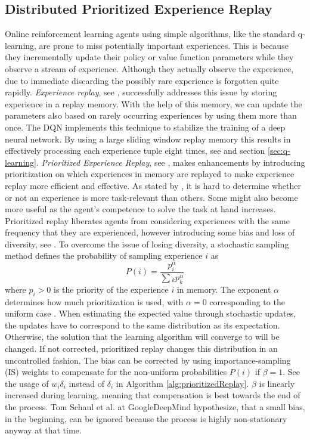\documentclass[12pt,a4paper]{article}
\begin{document}
\subsection{Distributed Prioritized Experience Replay}
Online reinforcement learning agents using simple algorithms, like the standard q-learning, are prone to miss potentially important experiences. This is because they incrementally update their policy or value function parameters while they observe a stream of experience. Although they actually observe the experience, due to immediate discarding the possibly rare experience is forgotten quite rapidly.
{\it Experience replay}, see \cite{Lin2014}, successfully addresses this issue by storing experience in a replay memory. With the help of this memory, we can update the parameters also based on rarely occurring experiences by using them more than once. The DQN implements this technique to stabilize the training of a deep neural network. By using a large sliding window replay memory this results in effectively processing each experience tuple eight times, see \cite{Schaul2016} and section \ref{sec:q-learning}.
{\it Prioritized Experience Replay}, see \cite{Schaul2016}, makes enhancements by introducing prioritization on which experiences in memory are replayed to make experience replay more efficient and effective. As stated by \cite{Schmidhuber1991CuriousMC}, it is hard to determine whether or not an experience is more task-relevant than others. Some might also become more useful as the agent's competence to solve the task at hand increases. Prioritized replay liberates agents from considering experiences with the same frequency that they are experienced, however introducing some bias and loss of diversity, see \cite{Schaul2016}.
To overcome the issue of losing diversity, a stochastic sampling method defines the probability of sampling experience $i$ as
\begin{equation*}
    P(i) = \frac{p_i^\alpha}{\sum{_k p_k^\alpha}}
\end{equation*}
where $p_i > 0$ is the priority of the experience $i$ in memory. The exponent $\alpha$ determines how much prioritization is used, with $\alpha = 0$ corresponding to the uniform case \cite{Schaul2016}.
When estimating the expected value through stochastic updates, the updates have to correspond to the same distribution as its expectation. Otherwise, the solution that the learning algorithm will converge to will be changed. If not corrected, prioritized replay changes this distribution in an uncontrolled fashion. The bias can be corrected by using importance-sampling (IS) weights to compensate for the non-uniform probabilities $P(i)$ if $\beta = 1$. See the usage of $w_i\delta_i$ instead of $\delta_i$ in Algorithm \ref{alg:prioritizedReplay}. $\beta$ is linearly increased during learning, meaning that compensation is best towards the end of the process. Tom Schaul et al. at GoogleDeepMind hypothesize, that a small bias, in the beginning, can be ignored because the process is highly non-stationary anyway at that time.
\end{document}
